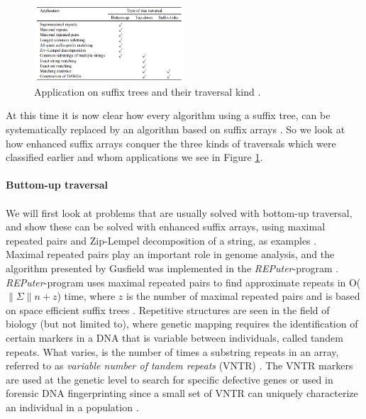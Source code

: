 \documentclass[12pt]{article} %
\begin{document}
\begin{figure}[H]
    \centering
    \includegraphics[width=0.5\textwidth]{traversalenchanced}
    \captionsetup{width=0.8\textwidth}
    \caption{Application on suffix trees and their traversal kind \cite{gusfield, enchancedsuffix}.}
    \label{fig:traversalenchanced}
\end{figure}

At this time it is now clear how every algorithm using a suffix tree, can be systematically replaced by an algorithm based on suffix arrays \cite{enchancedsuffix}. So we look at how enhanced suffix arrays conquer the three kinds of traversals which were classified earlier and whom applications we see in Figure \ref{fig:traversalenchanced}.
\\ \\
\textbf{Buttom-up traversal}
\\ \\
We will first look at problems that are usually solved with bottom-up traversal, and show these can be solved with enhanced suffix arrays, using maximal repeated pairs and Zip-Lempel decomposition of a string, as examples \cite{enchancedsuffix}.
\\
Maximal repeated pairs play an important role in genome analysis, and the algorithm presented by Gusfield was implemented in the \emph{REPuter}-program \cite{gusfield, enchancedsuffix}. \emph{REPuter}-program uses maximal repeated pairs to find approximate repeats in O($\|\Sigma\| n + z$) time, where $z$ is the number of maximal repeated pairs and is based on space efficient suffix trees \cite{enchancedsuffix}. Repetitive structures are seen in the field of biology (but not limited to), where genetic mapping requires the identification of certain markers in a DNA that is variable between individuals, called tandem repeats. What varies, is the number of times a substring repeats in an array, referred to as \emph{variable number of tandem repeats} (VNTR) \cite{gusfield}. The VNTR markers are used at the genetic level to search for specific defective genes or used in forensic DNA fingerprinting since a small set of VNTR can uniquely characterize an individual in a population \cite{gusfield}. 
\end{document}
